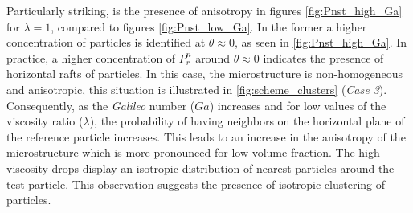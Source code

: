 Particularly striking, is the presence of anisotropy in figures \ref{fig:Pnst_high_Ga} for $\lambda=1$, compared to figures \ref{fig:Pnst_low_Ga}. In the former a higher concentration of particles is identified at $\theta \approx 0$, as seen in \ref{fig:Pnst_high_Ga}. In practice, a higher concentration of $P_r^n$ around $\theta \approx 0$ indicates the presence of horizontal rafts of particles. 
In this case, the microstructure is non-homogeneous and anisotropic, this situation is illustrated in \ref{fig:scheme_clusters} (\textit{Case 3}).  
Consequently, as the \textit{Galileo} number ($Ga$) increases and for low values of the viscosity ratio ($\lambda$), the probability of having neighbors on the horizontal plane of the reference particle increases. 
This leads to an increase in the anisotropy of the microstructure which is more pronounced for low volume fraction. The high viscosity drops display an isotropic distribution of nearest particles around the test particle. This observation suggests the presence of isotropic clustering of particles.





